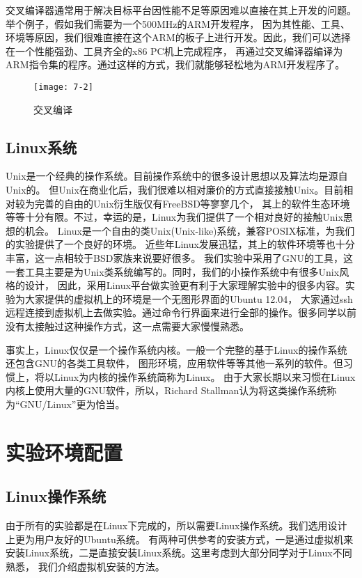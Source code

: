 交叉编译器通常用于解决目标平台因性能不足等原因难以直接在其上开发的问题。举个例子，假如我们需要为一个500MHz的ARM开发程序，
因为其性能、工具、环境等原因，我们很难直接在这个ARM的板子上进行开发。因此，我们可以选择在一个性能强劲、工具齐全的x86 PC机上完成程序，
再通过交叉编译器编译为ARM指令集的程序。通过这样的方式，我们就能够轻松地为ARM开发程序了。

\begin{figure}[htbp]
  \centering
  \texttt{[image: 7-2]}
  \caption{交叉编译}\label{fig:7-2}
\end{figure}

\subsection{Linux系统}
Unix是一个经典的操作系统。目前操作系统中的很多设计思想以及算法均是源自Unix的。
但Unix在商业化后，我们很难以相对廉价的方式直接接触Unix。目前相对较为完善的自由的Unix衍生版仅有FreeBSD等寥寥几个，
其上的软件生态环境等等十分有限。不过，幸运的是，Linux为我们提供了一个相对良好的接触Unix思想的机会。
Linux是一个自由的类Unix(Unix-like)系统，兼容POSIX标准，为我们的实验提供了一个良好的环境。
近些年Linux发展迅猛，其上的软件环境等也十分丰富，这一点相较于BSD家族来说要好很多。
我们实验中采用了GNU的工具，这一套工具主要是为Unix类系统编写的。同时，我们的小操作系统中有很多Unix风格的设计，
因此，采用Linux平台做实验更有利于大家理解实验中的很多内容。实验为大家提供的虚拟机上的环境是一个无图形界面的Ubuntu 12.04，
大家通过ssh远程连接到虚拟机上去做实验。通过命令行界面来进行全部的操作。很多同学以前没有太接触过这种操作方式，这一点需要大家慢慢熟悉。

\begin{note}
事实上，Linux仅仅是一个操作系统内核。一般一个完整的基于Linux的操作系统还包含GNU的各类工具软件，
图形环境，应用软件等等其他一系列的软件。但习惯上，将以Linux为内核的操作系统简称为Linux。
由于大家长期以来习惯在Linux内核上使用大量的GNU软件，所以，Richard Stallman认为将这类操作系统称为“GNU/Linux”更为恰当。
\end{note}

\section{实验环境配置}

\subsection{Linux操作系统}
由于所有的实验都是在Linux下完成的，所以需要Linux操作系统。我们选用设计上更为用户友好的Ubuntu系统。
有两种可供参考的安装方式，一是通过虚拟机来安装Linux系统，二是直接安装Linux系统。这里考虑到大部分同学对于Linux不同熟悉，
我们介绍虚拟机安装的方法。

